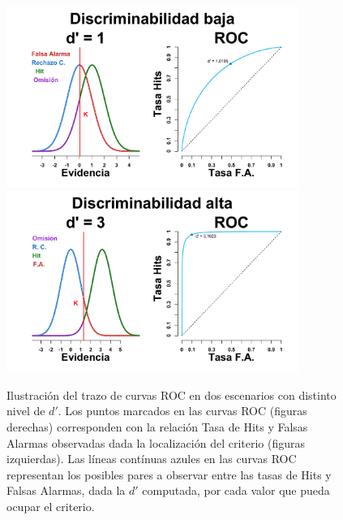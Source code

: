 \begin{figure}[p]
\centering
\includegraphics[width=0.85\textwidth]{Figures/ROC_2} \\
\includegraphics[width=0.85\textwidth]{Figures/ROC_3}\\
\decoRule
\caption[Trazo de curvas ROC]{Ilustración del trazo de curvas ROC en dos escenarios con distinto nivel de $d'$. Los puntos marcados en las curvas ROC (figuras derechas) corresponden con la relación Tasa de Hits y Falsas Alarmas observadas dada la localización del criterio (figuras izquierdas). Las líneas contínuas azules en las curvas ROC representan los posibles pares a observar entre las tasas de Hits y Falsas Alarmas, dada la $d'$ computada, por cada valor que pueda ocupar el criterio.}
\label{fig:Graf_ROC}
\end{figure}


